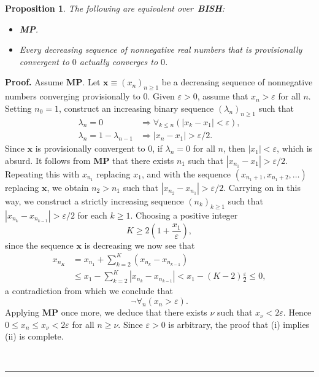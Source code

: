 \documentclass[11pt]{article}%
\newtheorem{proposition}[theorem]{Proposition}
\newenvironment{proof}[1][Proof]{\noindent\textbf{#1.} }{\ \rule{0.5em}{0.5em}}
\begin{document}
\begin{proposition}
\label{2}The following are equivalent over\emph{\ \textbf{BISH}}:

\begin{itemize}
\item[\emph{(i)}] \emph{\textbf{MP}}.

\item[\emph{(ii)}] Every decreasing sequence of nonnegative real numbers that
is provisionally convergent to $0$ actually converges to $0$.
\end{itemize}
\end{proposition}

\begin{proof}
Assume \textbf{MP}. Let $\mathbf{x\equiv}\left(  x_{n}\right)  _{n\geqslant1}
$ be a decreasing sequence of nonnegative numbers converging provisionally to
$0$. Given $\varepsilon>0$, assume that $x_{n}>\varepsilon$ for all $n$.
Setting $n_{0}=1$, construct an increasing binary sequence $\left(
\lambda_{n}\right)  _{n\geqslant1}$ such that%
\begin{align*}
\lambda_{n}=0  & \Rightarrow\forall_{k\leqslant n}\left(  \left\vert
x_{k}-x_{1}\right\vert <\varepsilon\right)  ,\\
\lambda_{n}=1-\lambda_{n-1}  & \Rightarrow\left\vert x_{n}-x_{1}\right\vert
>\varepsilon/2.
\end{align*}
Since $\mathbf{x}$ is provisionally convergent to $0$, if $\lambda_{n}=0$ for
all $n$, then $\left\vert x_{1}\right\vert <\varepsilon$, which is absurd. It
follows from \textbf{MP} that there exists $n_{1}$ such that $\left\vert
x_{n_{1}}-x_{1}\right\vert >\varepsilon/2$. Repeating this with $x_{n_{1}}$
replacing $x_{1}$, and with the sequence $\left(  x_{n_{1}+1},x_{n_{1}%
+2},\ldots\right)  $ replacing $\mathbf{x}$, we obtain $n_{2}>n_{1}$ such that
$\left\vert x_{n_{2}}-x_{n_{1}}\right\vert >\varepsilon/2$. Carrying on in
this way, we construct a strictly increasing sequence $\left(  n_{k}\right)
_{k\geqslant1}$ such that $\left\vert x_{n_{k}}-x_{n_{k-1}}\right\vert
>\varepsilon/2$ for each $k\geqslant1$. Choosing a positive integer%
\[
K\geqslant2\left(  1+\frac{x_{1}}{\varepsilon}\right)  ,
\]
since the sequence $\mathbf{x}$ is decreasing we now see that%
\begin{align*}
x_{n_{K}}  & =x_{n_{1}}+\sum_{k=2}^{K}\left(  x_{n_{k}}-x_{n_{k-1}}\right) \\
& \leqslant x_{1}-\sum_{k=2}^{K}\left\vert x_{n_{k}}-x_{n_{k-1}}\right\vert
<x_{1}-\left(  K-2\right)  \frac{\varepsilon}{2}\leqslant0,
\end{align*}
a contradiction from which we conclude that%
\[
\lnot\forall_{n}\left(  x_{n}>\varepsilon\right)  .
\]
Applying \textbf{MP} once more, we deduce that there exists $\nu$ such that
$x_{\nu}<2\varepsilon$. Hence $0\leqslant x_{n}\leqslant x_{\nu}<2\varepsilon$
for all $n\geqslant\nu$. Since $\varepsilon>0$ is arbitrary, the proof that
(i) implies (ii) is complete.


\end{proof}
\end{document}
